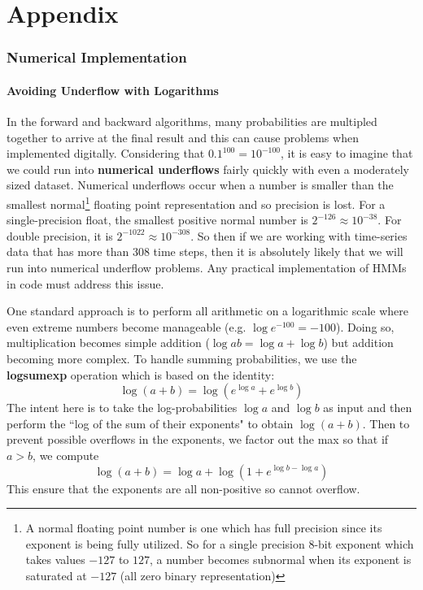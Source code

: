 \documentclass[onecolumn]{gwclass}
\begin{document}
	\newpage
	\part*{Appendix}
	\appendix
	\section{Numerical Implementation}
	\subsection{Avoiding Underflow with Logarithms}
	In the forward and backward algorithms, many probabilities are multipled together to arrive at the final result and this can cause problems when implemented digitally. Considering that $0.1^{100} = 10^{-100}$, it is easy to imagine that we could run into \textbf{numerical underflows} fairly quickly with even a moderately sized dataset. Numerical underflows occur when a number is smaller than the smallest normal\footnote{A normal floating point number is one which has full precision since its exponent is being fully utilized. So for a single precision 8-bit exponent which takes values $-127$ to $127$, a number becomes subnormal when its exponent is saturated at $-127$ (all zero binary representation)} floating point representation and so precision is lost. For a single-precision float, the smallest positive normal number is $2^{-126}\approx 10^{-38}$. For double precision, it is $2^{-1022}\approx 10^{-308}$. So then if we are working with time-series data that has more than 308 time steps, then it is absolutely likely that we will run into numerical underflow problems. Any practical implementation of HMMs in code must address this issue.
	
	One standard approach is to perform all arithmetic on a logarithmic scale where even extreme numbers become manageable (e.g. $\log e^{-100} = -100$). Doing so, multiplication becomes simple addition ($\log ab = \log a + \log b$) but addition becoming more complex. To handle summing probabilities, we use the \textbf{logsumexp} operation which is based on the identity:
	$$\log(a+b) = \log(e^{\log a} + e^{\log b}) $$
	The intent here is to take the log-probabilities $\log a$ and $\log b$ as input and then perform the ``log of the sum of their exponents" to obtain $\log(a+b)$. Then to prevent possible overflows in the exponents, we factor out the max so that if $a>b$, we compute
	$$ \log(a+b) = \log a + \log(1 + e^{\log b  - \log a}) $$
	This ensure that the exponents are all non-positive so cannot overflow.
	
\end{document}

